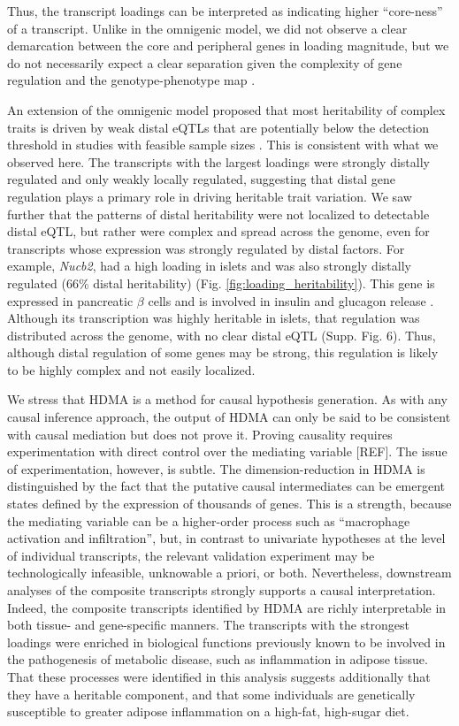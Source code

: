 \documentclass[
]{article}
\begin{document}
Thus, the transcript loadings can be interpreted as indicating higher
``core-ness'' of a transcript. Unlike in the omnigenic model, we did not
observe a clear demarcation between the core and peripheral genes in
loading magnitude, but we do not necessarily expect a clear separation
given the complexity of gene regulation and the genotype-phenotype map
\cite{pmid29906445}.

An extension of the omnigenic model proposed that most heritability of
complex traits is driven by weak distal eQTLs that are potentially below
the detection threshold in studies with feasible sample sizes
\cite{pmid31051098}. This is consistent with what we observed here. The
transcripts with the largest loadings were strongly distally regulated
and only weakly locally regulated, suggesting that distal gene
regulation plays a primary role in driving heritable trait variation. We
saw further that the patterns of distal heritability were not localized
to detectable distal eQTL, but rather were complex and spread across the
genome, even for transcripts whose expression was strongly regulated by
distal factors. For example, \textit{Nucb2}, had a high loading in
islets and was also strongly distally regulated (66\% distal
heritability) (Fig. \ref{fig:loading_heritability}). This gene is
expressed in pancreatic \(\beta\) cells and is involved in insulin and
glucagon release \cite{pmid22108805, pmid23537085, pmid24993278}.
Although its transcription was highly heritable in islets, that
regulation was distributed across the genome, with no clear distal eQTL
(Supp. Fig. 6). Thus, although distal regulation of some genes may be
strong, this regulation is likely to be highly complex and not easily
localized.

We stress that HDMA is a method for causal hypothesis generation. As
with any causal inference approach, the output of HDMA can only be said
to be consistent with causal mediation but does not prove it. Proving
causality requires experimentation with direct control over the
mediating variable {[}REF{]}. The issue of experimentation, however, is
subtle. The dimension-reduction in HDMA is distinguished by the fact
that the putative causal intermediates can be emergent states defined by
the expression of thousands of genes. This is a strength, because the
mediating variable can be a higher-order process such as ``macrophage
activation and infiltration'', but, in contrast to univariate hypotheses
at the level of individual transcripts, the relevant validation
experiment may be technologically infeasible, unknowable a priori, or
both. Nevertheless, downstream analyses of the composite transcripts
strongly supports a causal interpretation. Indeed, the composite
transcripts identified by HDMA are richly interpretable in both tissue-
and gene-specific manners. The transcripts with the strongest loadings
were enriched in biological functions previously known to be involved in
the pathogenesis of metabolic disease, such as inflammation in adipose
tissue. That these processes were identified in this analysis suggests
additionally that they have a heritable component, and that some
individuals are genetically susceptible to greater adipose inflammation
on a high-fat, high-sugar diet.
\end{document}
